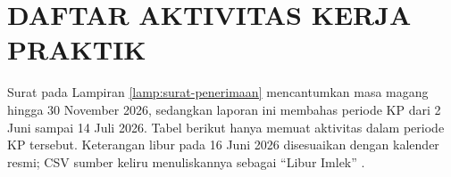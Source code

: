 \cleardoublepage
\chapter{DAFTAR AKTIVITAS KERJA PRAKTIK}
\label{lamp:aktivitas-kp}

Surat pada Lampiran \ref{lamp:surat-penerimaan} mencantumkan masa magang hingga 30 November 2026, sedangkan laporan ini membahas periode KP dari 2 Juni sampai 14 Juli 2026. Tabel berikut hanya memuat aktivitas dalam periode KP tersebut. Keterangan libur pada 16 Juni 2026 disesuaikan dengan kalender resmi; CSV sumber keliru menuliskannya sebagai ``Libur Imlek'' \parencite{libur2026}.


